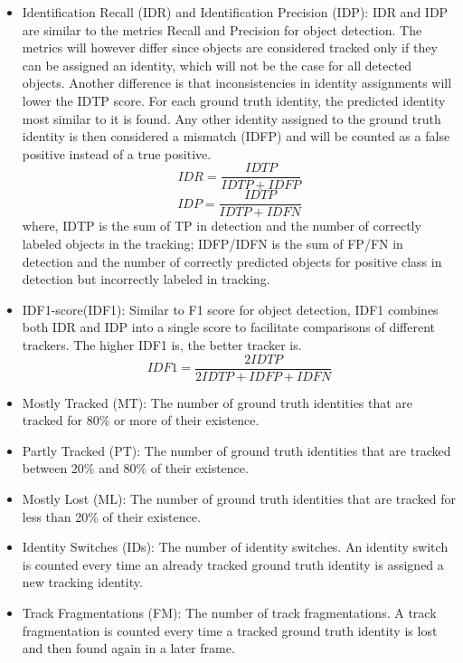 \begin{itemize}
	\item Identification Recall (IDR) and Identification Precision (IDP): IDR and IDP are similar to the metrics Recall and Precision for object detection. The metrics will however differ since objects are considered tracked only if they can be assigned an identity, which will not be the case for all detected objects. Another difference is that inconsistencies in identity assignments will lower the IDTP score. For each ground truth identity, the predicted identity most similar to it is found. Any other identity assigned to the ground truth identity is then considered a mismatch (IDFP) and will be counted as a false positive instead of a true positive.
	\begin{equation}
		IDR = \frac{IDTP}{IDTP+IDFP}
	\end{equation}
	\begin{equation}
		IDP = \frac{IDTP}{IDTP+IDFN}
	\end{equation}
where, IDTP is the sum of TP in detection and the number of correctly labeled objects in the tracking; IDFP/IDFN is the sum of FP/FN in detection and the number of correctly predicted objects for positive class in detection but incorrectly labeled in tracking.
	\item IDF1-score(IDF1): Similar to F1 score for object detection, IDF1 combines both IDR and IDP into a single score to facilitate comparisons of different trackers. The higher IDF1 is, the better tracker is.
	\begin{equation}
		IDF1 = \frac{2IDTP}{2IDTP+IDFP+IDFN}
	\end{equation}
	\item Mostly Tracked (MT): The number of ground truth identities that are tracked for 80\% or more of their existence.
	\item Partly Tracked (PT): The number of ground truth identities that are tracked between 20\% and 80\% of their existence.
	\item Mostly Lost (ML): The number of ground truth identities that are tracked for less than 20\% of their existence.
	\item Identity Switches (IDs): The number of identity switches. An identity switch is counted every time an already tracked ground truth identity is assigned a new tracking identity.
	\item Track Fragmentations (FM): The number of track fragmentations. A track fragmentation is counted every time a tracked ground truth identity is lost and then found again in a later frame.

\end{itemize}
